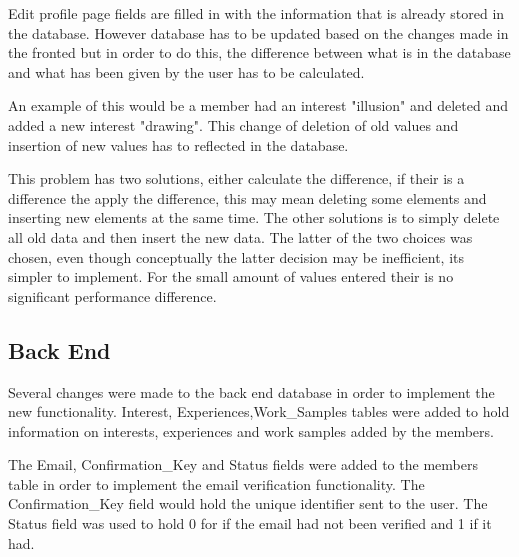 \documentclass[a4paper,oneside,11pt]{report}
\begin{document}
Edit profile page fields are filled in with the information that is already stored in the database. However database has to be updated based on the changes made in the fronted but in order to do this, the difference between what is in the database and what has been given by the user has to be calculated. 
\pagebreak

An example of this would be a member had an interest "illusion" and deleted and added a new interest "drawing". This change of deletion of old values and insertion of new values has to reflected in the database.

This problem has two solutions, either calculate the difference, if their is a difference the apply the difference, this may mean deleting some elements and inserting new elements at the same time. The other solutions is to simply delete all old data and then insert the new data. The latter of the two choices was chosen, even though conceptually the latter decision may be inefficient, its simpler to implement. For the small amount of values entered their is no significant performance difference.
\pagebreak
\subsection{Back End}
Several changes were made to the back end database in order to implement the new functionality. Interest, Experiences,Work\_Samples tables were added to hold information on interests, experiences and work samples added by the members.

The Email, Confirmation\_Key and Status fields were added to the members table in order to implement the email verification functionality. The Confirmation\_Key field would hold the unique identifier sent to the user. The Status field was used to hold 0 for if the email had not been verified and 1 if it had.
\end{document}
